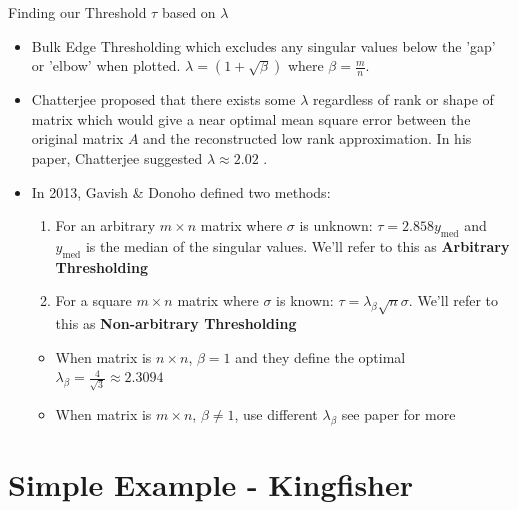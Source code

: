 \documentclass[aspectratio=169,xcolor=dvipsnames]{beamer}
\begin{document}
	
	\begin{frame}{Finding our Threshold $\tau$ based on $\lambda$}
		\begin{itemize}
			\item Bulk Edge Thresholding which excludes any singular values below the 'gap' or 'elbow' when plotted. $\lambda = (1+\sqrt{\beta})$ where $\beta = \frac{m}{n}$.
			\item Chatterjee proposed that there exists some $\lambda$ regardless of rank or shape of matrix which would give a near optimal mean square error between the original matrix $A$ and the reconstructed low rank approximation. In his paper, Chatterjee suggested $\lambda \approx 2.02$ \cite{Chatterjee2015}.  
			\item In 2013, Gavish \& Donoho defined two methods:
			\begin{enumerate}
				\item For an arbitrary $m\times n$ matrix where $\sigma$ is unknown: $\tau = 2.858y_{\text{med}}$ and $y_{\text{med}}$ is the median of the singular values. We'll refer to this as \textbf{Arbitrary Thresholding}
				\item For a square $m\times n$ matrix where $\sigma$ is known: $\tau = \lambda_\beta\sqrt{n}\sigma$. We'll refer to this as \textbf{Non-arbitrary Thresholding}
			\end{enumerate}
			\begin{itemize}
				\item When matrix is $n\times n$, $\beta = 1$ and they define the optimal $\lambda_\beta = \frac{4}{\sqrt{3}}\approx 2.3094$
				\item When matrix is $m\times n$, $\beta \neq 1$, use different $\lambda_\beta$ see paper for more\cite{Gavish2013}
			\end{itemize}
		\end{itemize}
	\end{frame}
	
	\section{Simple Example - Kingfisher}
	
\end{document}
